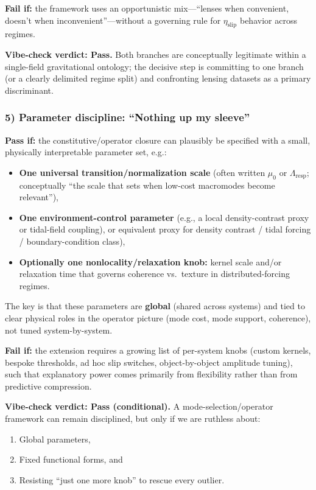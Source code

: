 \documentclass[11pt]{article}
\begin{document}
\textbf{Fail if:} the framework uses an opportunistic mix---``lenses when convenient, doesn't 
when inconvenient''---without a governing rule for $\eta_{\text{slip}}$ behavior across regimes.

\checkmark \textbf{Vibe-check verdict: Pass.} Both branches are conceptually legitimate within 
a single-field gravitational ontology; the decisive step is committing to one branch (or a 
clearly delimited regime split) and confronting lensing datasets as a primary discriminant.

\subsubsection{5) Parameter discipline: ``Nothing up my sleeve''}

\textbf{Pass if:} the constitutive/operator closure can plausibly be specified with a small, 
physically interpretable parameter set, e.g.:
\begin{itemize}
  \item \textbf{One universal transition/normalization scale} (often written $\mu_0$ or 
    $\Lambda_{\text{resp}}$; conceptually ``the scale that sets when low-cost macromodes 
    become relevant''),
  
  \item \textbf{One environment-control parameter} (e.g., a local density-contrast proxy or 
    tidal-field coupling), or equivalent proxy for density contrast / tidal forcing / boundary-condition class),
  
  \item \textbf{Optionally one nonlocality/relaxation knob:} kernel scale and/or relaxation 
    time that governs coherence vs.\ texture in distributed-forcing regimes.
\end{itemize}

The key is that these parameters are \textbf{global} (shared across systems) and tied to 
clear physical roles in the operator picture (mode cost, mode support, coherence), not tuned 
system-by-system.

\textbf{Fail if:} the extension requires a growing list of per-system knobs (custom kernels, 
bespoke thresholds, ad hoc slip switches, object-by-object amplitude tuning), such that 
explanatory power comes primarily from flexibility rather than from predictive compression.

\checkmark \textbf{Vibe-check verdict: Pass (conditional).} A mode-selection/operator framework 
can remain disciplined, but only if we are ruthless about:
\begin{enumerate}
  \item Global parameters,
  \item Fixed functional forms, and
  \item Resisting ``just one more knob'' to rescue every outlier.
\end{enumerate}
\end{document}
